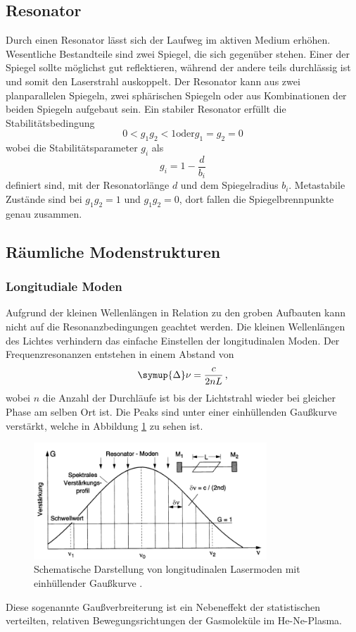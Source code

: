 \subsection{Resonator}
Durch einen Resonator lässt sich der Laufweg im aktiven Medium erhöhen. Wesentliche Bestandteile sind zwei Spiegel, die sich gegenüber stehen.
Einer der Spiegel sollte möglichst gut reflektieren, während der andere teils durchlässig ist und somit den Laserstrahl auskoppelt.
Der Resonator kann aus zwei planparallelen Spiegeln, zwei sphärischen Spiegeln oder aus Kombinationen der beiden Spiegeln aufgebaut sein.
Ein stabiler Resonator erfüllt die Stabilitätsbedingung
\begin{equation}
    0 < g_1 g_2 < 1 \text{oder} g_1 = g_2 = 0
    \label{eqn:stabi}
\end{equation}
wobei die Stabilitätsparameter $g_i$ als
\begin{equation}
    g_i = 1 - \frac{d}{b_i}
    \label{eqn:Stabilitätsparameter}
\end{equation}
definiert sind, mit der Resonatorlänge $d$ und dem Spiegelradius $b_i$.
Metastabile Zustände sind bei $g_1 g_2 = 1$ und $g_1 g_2 = 0$, dort fallen die Spiegelbrennpunkte genau zusammen.

\subsection{Räumliche Modenstrukturen}
\subsubsection{Longitudiale Moden}
Aufgrund der kleinen Wellenlängen in Relation zu den groben Aufbauten
kann nicht auf die Resonanzbedingungen geachtet werden.
Die kleinen Wellenlängen des Lichtes verhindern das einfache Einstellen der
longitudinalen Moden. Der Frequenzresonanzen entstehen in einem Abstand von
\begin{equation}
    \symup{\Delta}\nu = \frac{c}{2 n L} \, \text{,}
    \label{eqn:delnu}
\end{equation}
wobei $n$ die Anzahl der Durchläufe ist bis der Lichtstrahl wieder bei gleicher Phase am selben Ort ist.
Die Peaks sind unter einer einhüllenden Gaußkurve verstärkt, welche in Abbildung \ref{pic:kamm} zu sehen ist. 
\begin{figure}
    \centering
    \includegraphics[width = 0.78\textwidth]{pics/kamm.png}
    \caption{Schematische Darstellung von longitudinalen Lasermoden mit einhüllender Gaußkurve \cite{Laserspektroskopie}.}
    \label{pic:kamm}
\end{figure}
Diese sogenannte Gaußverbreiterung ist ein Nebeneffekt der statistischen verteilten,
relativen Bewegungsrichtungen der Gasmoleküle im He-Ne-Plasma.

